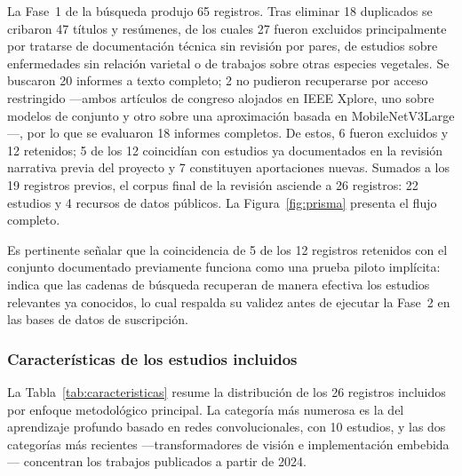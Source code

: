 La Fase~1 de la búsqueda produjo 65 registros. Tras eliminar 18 duplicados se
cribaron 47 títulos y resúmenes, de los cuales 27 fueron excluidos
principalmente por tratarse de documentación técnica sin revisión por pares,
de estudios sobre enfermedades sin relación varietal o de trabajos sobre otras
especies vegetales. Se buscaron 20 informes a texto completo; 2 no pudieron
recuperarse por acceso restringido —ambos artículos de congreso alojados en
IEEE Xplore, uno sobre modelos de conjunto y otro sobre una aproximación
basada en MobileNetV3Large—, por lo que se evaluaron 18 informes completos.
De estos, 6 fueron excluidos y 12 retenidos; 5 de los 12 coincidían con
estudios ya documentados en la revisión narrativa previa del proyecto y 7
constituyen aportaciones nuevas. Sumados a los 19 registros previos, el corpus
final de la revisión asciende a 26 registros: 22 estudios y 4 recursos de
datos públicos. La Figura~\ref{fig:prisma} presenta el flujo completo.

Es pertinente señalar que la coincidencia de 5 de los 12 registros retenidos
con el conjunto documentado previamente funciona como una prueba piloto
implícita: indica que las cadenas de búsqueda recuperan de manera efectiva los
estudios relevantes ya conocidos, lo cual respalda su validez antes de
ejecutar la Fase~2 en las bases de datos de suscripción.

\subsubsection{Características de los estudios incluidos}

La Tabla~\ref{tab:caracteristicas} resume la distribución de los 26 registros
incluidos por enfoque metodológico principal. La categoría más numerosa es la
del aprendizaje profundo basado en redes convolucionales, con 10 estudios, y
las dos categorías más recientes —transformadores de visión e implementación
embebida— concentran los trabajos publicados a partir de 2024.

